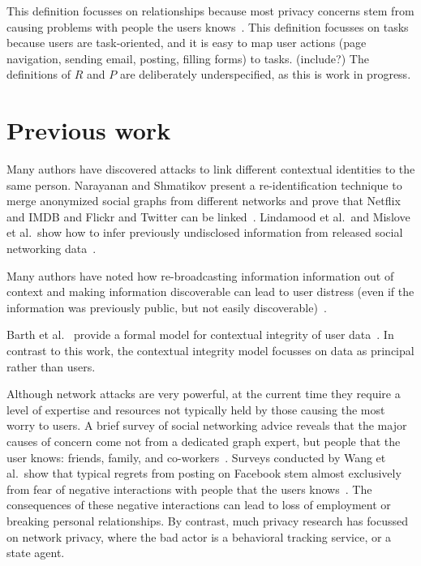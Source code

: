 \documentclass{llncs}
\begin{document}
This definition focusses on relationships because most privacy concerns stem
from causing problems with people the users knows~\cite{wang}. This definition
focusses on tasks because users are task-oriented, and it is easy to map user
actions (page navigation, sending email, posting, filling forms) to tasks.
(include?) The definitions of $R$ and $P$ are deliberately underspecified, as
this is work in progress.

\section{Previous work}

Many authors have discovered attacks to link different contextual identities to
the same person. Narayanan and Shmatikov present a re-identification technique
to merge anonymized social graphs from different networks and prove that
Netflix and IMDB and Flickr and Twitter can be
linked~\cite{narayanan1,narayanan2}. Lindamood et al.~and Mislove et al.~show
how to infer previously undisclosed information from released social networking
data~\cite{lindamood,mislove}.

Many authors have noted how re-broadcasting information information out of
context and making information discoverable can lead to user distress (even if
the information was previously public, but not easily
discoverable)~\cite{boyd1,chew,nissenbaum}.

Barth et al.~ provide a formal model for contextual integrity of user
data~\cite{barth}. In contrast to this work, the contextual integrity model
focusses on data as principal rather than users.

\begin{comment}TODO: figure out how to cite this. Why is this short
paper's model worth pursuing? It's simpler, and focusses on the user rather
than data.
\end{comment}

Although network attacks are very powerful, at the current time they require a
level of expertise and resources not typically held by those causing the most
worry to users. A brief survey of social networking advice reveals that the
major causes of concern come not from a dedicated graph expert, but people that
the user knows: friends, family, and co-workers~\cite{fbtips2,fbtips1}.
Surveys conducted by Wang et al.~show that typical regrets from posting on
Facebook stem almost exclusively from fear of negative interactions with people
that the users knows~\cite{wang}. The consequences of these negative
interactions can lead to loss of employment or breaking personal relationships.
By contrast, much privacy research has focussed on network privacy, where the
bad actor is a behavioral tracking service, or a state agent.
\end{document}
